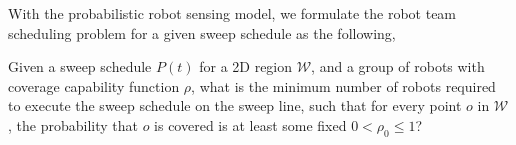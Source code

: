 
With the probabilistic robot sensing model, we formulate the robot team scheduling problem for a given sweep schedule as the following,
\begin{problem}
Given a sweep schedule $P(t)$ for a 2D region $\mathcal W$, and a group of robots with coverage capability function $\rho$, what is the minimum number of robots required to execute the sweep schedule on the sweep line, such that 
for every point $o$ in $\mathcal W$, the probability that $o$ is covered is at 
least some fixed $0 < \rho_0 \le 1$?
\end{problem}


